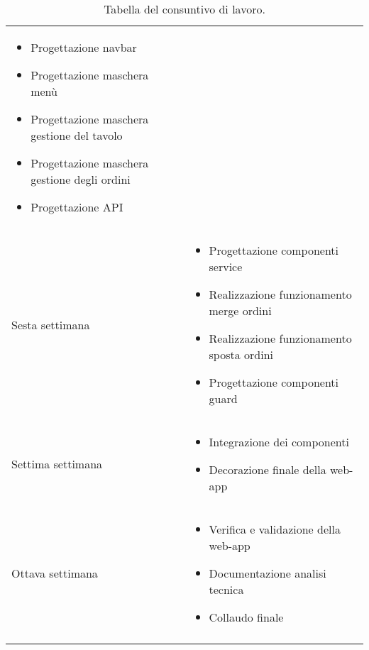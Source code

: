 \begin{center}
\begin{longtable}{ |p{3cm}|p{9cm}|  }
\begin{itemize}
            \item Progettazione navbar
            \item Progettazione maschera menù
            \item Progettazione maschera gestione del tavolo
            \item Progettazione maschera gestione degli ordini
            \item Progettazione API
        \end{itemize}\\
        Sesta settimana&\begin{itemize}
            \item Progettazione componenti service
            \item Realizzazione funzionamento merge ordini
            \item Realizzazione funzionamento sposta ordini
            \item Progettazione componenti guard
        \end{itemize}\\
        Settima settimana&\begin{itemize}
            \item Integrazione dei componenti
            \item Decorazione finale della web-app
        \end{itemize}\\
        Ottava settimana&\begin{itemize}
            \item Verifica e validazione della web-app
            \item Documentazione analisi tecnica
            \item Collaudo finale
        \end{itemize}\\
\hline
\caption{\label{tab:tabella consuntivo lavoro}Tabella del consuntivo di lavoro.}
\end{longtable}
\end{center}
\pagebreak


